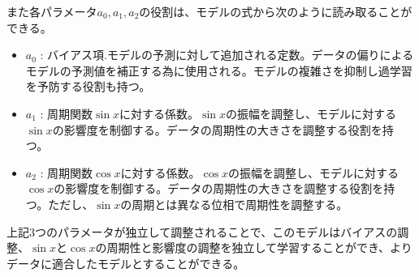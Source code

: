 \documentclass{article}[jsarticle]
\begin{document}
    また各パラメータ$a_0, a_1, a_2$の役割は、モデルの式から次のように読み取ることができる。
    \begin{itemize}
        \item $a_0$ : バイアス項.モデルの予測に対して追加される定数。データの偏りによるモデルの予測値を補正する為に使用される。モデルの複雑さを抑制し過学習を予防する役割も持つ。
        \item $a_1$ : 周期関数$\sin x$に対する係数。$\sin x$の振幅を調整し、モデルに対する$\sin x$の影響度を制御する。データの周期性の大きさを調整する役割を持つ。
        \item $a_2$ : 周期関数$\cos x$に対する係数。$\cos x$の振幅を調整し、モデルに対する$\cos x$の影響度を制御する。データの周期性の大きさを調整する役割を持つ。ただし、$\sin x$の周期とは異なる位相で周期性を調整する。
    \end{itemize}
    上記3つのパラメータが独立して調整されることで、このモデルはバイアスの調整、$\sin x$と$\cos x$の周期性と影響度の調整を独立して学習することができ、よりデータに適合したモデルとすることができる。\par
\end{document}
